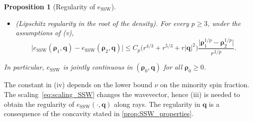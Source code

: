 \documentclass[final,reqno]{amsart}
\newtheorem{proposition}[theorem]{Proposition}
\theoremstyle{remark}
\renewcommand{\le}{\leqslant}
\renewcommand{\ge}{\geqslant}
\newcommand{\SSW}{\mathrm{SSW}}
\begin{document}
\begin{proposition}[Regularity of $e_\SSW$]
\begin{itemize}
\begin{equation}\label{eq:Holder_SSW}
\big|e_\SSW(\bm{\rho}_1,\mathbf{q})-e_\SSW(\bm{\rho}_2,\mathbf{q})\big|
\le C\big(r^{4/3}+r^{5/3}+r|\mathbf{q}|^2\big)
\left(\frac{|\bm{\rho}_1-\bm{\rho}_2|}{r}\right)^{1/3}
\end{equation}
with a universal constant $C$.
\item[(vi)] \emph{(Lipschitz regularity in the root of the density)}. For every $p\ge3$, under the assumptions of (v),
\begin{equation}\label{eq:root_Lipschitz_SSW}
\big|e_\SSW(\bm{\rho}_1,\mathbf{q})-e_\SSW(\bm{\rho}_2,\mathbf{q})\big|
\le C_p\big(r^{4/3}+r^{5/3}+r|\mathbf{q}|^2\big)
\frac{\big|\bm{\rho}_1^{1/p}-\bm{\rho}_2^{1/p}\big|}{r^{1/p}}.
\end{equation}
\end{itemize}
In particular, $e_\SSW$ is jointly continuous in $(\bm{\rho}_0,\mathbf{q})$ for all $\bm{\rho}_0\ge0$.
\end{proposition}

The constant in (iv) depends on the lower bound $\nu$ on the minority spin fraction. The scaling~\cref{eq:scaling_SSW} changes the wavevector, hence (iii) is needed to obtain the regularity of $e_\SSW(\cdot,\mathbf{q})$ along rays. The regularity in $\mathbf{q}$ is a consequence of the concavity stated in \cref{prop:SSW_properties}.
\end{document}
